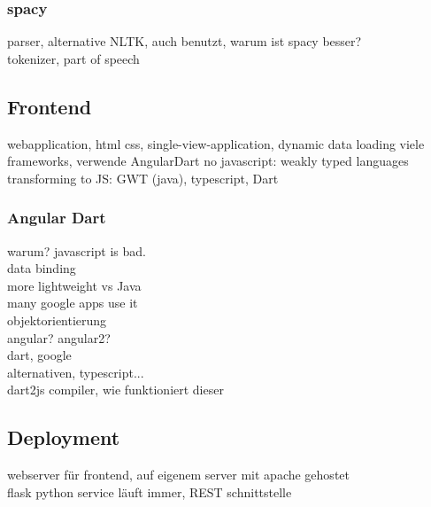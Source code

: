 \subsubsection{spacy}
\label{sec:spacy}
parser, alternative NLTK, auch benutzt, warum ist spacy besser?\\
tokenizer, part of speech

\subsection{Frontend}

webapplication, html css, single-view-application, dynamic data loading
viele frameworks, verwende AngularDart
no javascript: weakly typed languages transforming to JS: GWT (java), typescript, Dart

\subsubsection{Angular Dart}
\label{sec:angulardart}
warum? javascript is bad.\\

data binding\\
more lightweight vs Java\\

many google apps use it\\
objektorientierung\\

angular? angular2?\\

dart, google\\
alternativen, typescript...\\

dart2js compiler, wie funktioniert dieser\\

\subsection{Deployment}

webserver für frontend, auf eigenem server mit apache gehostet\\
flask python service läuft immer, REST schnittstelle\\






